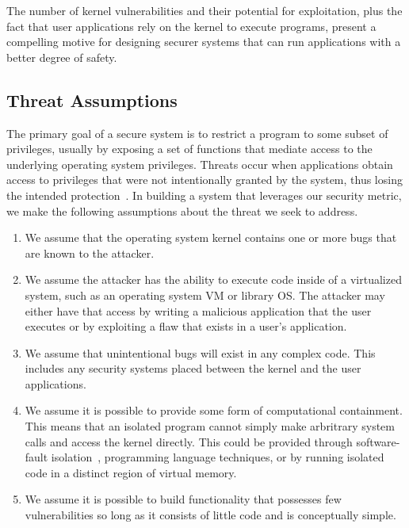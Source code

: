 The number of kernel vulnerabilities and their potential for exploitation, 
plus the fact that user applications rely on the kernel to execute
programs, 
present a compelling motive for designing securer systems that can run
applications with a better degree of safety. 

\subsection{Threat Assumptions}

The primary goal of a secure system is to restrict a program to some subset
of privileges, 
usually by exposing a set of functions that mediate access to the
underlying operating system privileges. 
Threats occur when applications obtain access to privileges that were not
intentionally granted by the system, 
thus losing the intended protection~\cite{Repy-10}. In building a system
that leverages our security metric, 
we make the following assumptions about the threat we seek to address.

\begin{enumerate}
\item We assume that the operating system kernel contains one or more bugs 
that are known to the attacker.

\item We assume the attacker has the ability to execute code inside
of a virtualized system, such as an operating system VM or library OS.
The attacker may either have that access by writing a malicious application
that the user executes or by exploiting a flaw that exists in a user's
application.


\item We assume that unintentional bugs will exist in any complex code.  This
includes any security systems placed between the kernel and the user
applications.

\item We assume it is possible to provide some form of computational 
containment.  This means that an isolated program cannot simply
make arbritrary system calls and access the kernel directly.  This could
be provided through software-fault isolation~\cite{SFI:93}, programming 
language techniques, or by running isolated code in a
distinct region of virtual memory.

\item We assume it is possible to build functionality that possesses few
vulnerabilities so long as it consists of little code and is conceptually 
simple.

\end{enumerate}

